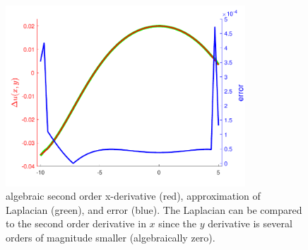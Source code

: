 \documentclass[paper=a4, fontsize=12pt]{article} %
\begin{document}
\begin{figure}[H]
  \centering
  \includegraphics[width=0.8\textwidth]{comparison-xx.pdf}
  \caption{\small algebraic second order x-derivative (red), approximation of Laplacian (green), and error (blue). The Laplacian can be compared to the second order derivative in $x$ since the $y$ derivative is several orders of magnitude smaller (algebraically zero). \label{fig:2derivX}}
\end{figure}
\end{document}
